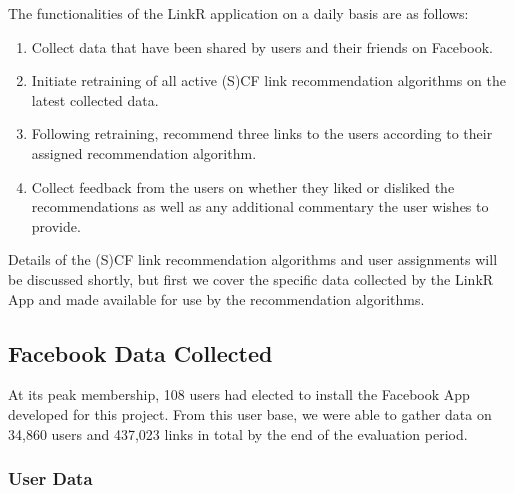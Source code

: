 The functionalities of the LinkR application on a daily basis are as follows:
\begin{enumerate}
\item{Collect data that have been shared by users and their friends on Facebook.}
\item{Initiate retraining of all active (S)CF link recommendation algorithms on the latest collected data.}
\item{Following retraining, recommend three links to the users according to their assigned recommendation algorithm.}
\item{Collect feedback from the users on whether they liked or disliked the recommendations as well as any additional commentary the user wishes to provide.}
\end{enumerate}
Details of the (S)CF link recommendation algorithms and user assignments
will be discussed shortly, but first we cover the specific data
collected by the LinkR App and made available for use by the
recommendation algorithms.

\subsection{Facebook Data Collected}

\label{sec:dataset}

At its peak membership, 108 users had elected to install the Facebook
App developed for this project.  From this user base, we were able to
gather data on 34,860 users and 437,023 links in total by the end of
the evaluation period.

\subsubsection{User Data}

